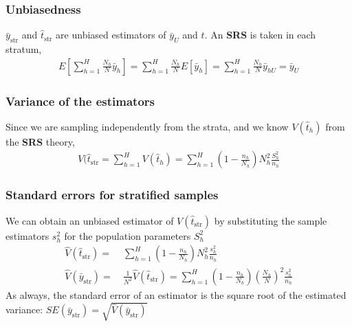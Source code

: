 \documentclass[a4paper,twoside,11pt]{article}
\begin{document}
\subsubsection{Unbiasedness}
$\bar{y}_{\text{str}}$ and $\hat{t}_{\text{str}}$ are unbiased estimators of $\bar{y}_U$ and $t$. An \textbf{SRS} is taken in each stratum, 
\begin{equation*}
\begin{aligned}
E[\sum^H_{h=1} \frac{N_h}{N}\bar{y}_h] = \sum^H_{h=1} \frac{N_h}{N}E[\bar{y}_h] = \sum^H_{h=1} \frac{N_h}{N} \bar{y}_{hU} = \bar{y}_U
\end{aligned}
\end{equation*}
\subsubsection{Variance of the estimators}
Since we are sampling independently from the strata, and we know $V(\hat{t}_h)$ from the \textbf{SRS} theory,
\begin{equation*}
\begin{aligned}
V(\hat{t}_{\text{str}} = \sum^H_{h=1} V(\hat{t}_h) = \sum^H_{h=1} (1-\frac{n_h}{N_h}) N_h^2 \frac{S_h^2}{n_h}
\end{aligned}
\end{equation*}
\subsubsection{Standard errors for stratified samples}
We can obtain an unbiased estimator of $V(\hat{t}_{\text{str}})$ by substituting the sample estimators $s_h^2$ for the population parameters $S_h^2$
\begin{equation*}
\begin{aligned}
\hat{V}(\hat{t}_{\text{str}}) =& \  \sum^H_{h=1} (1-\frac{n_h}{N_h}) N_h^2 \frac{s_h^2}{n_h} \\
\hat{V}(\bar{y}_{\text{str}}) =& \ \frac{1}{N^2} \hat{V}(\hat{t}_{\text{str}}) = \sum^H_{h=1} (1-\frac{n_h}{N_h})(\frac{N_h}{N})^2 \frac{s_h^2}{n_h}
\end{aligned}
\end{equation*}
As always, the standard error of an estimator is the square root of the estimated variance: $SE(\bar{y}_{\text{str}}) = \sqrt{\hat{V}(\bar{y}_{\text{str}})}$
\end{document}
